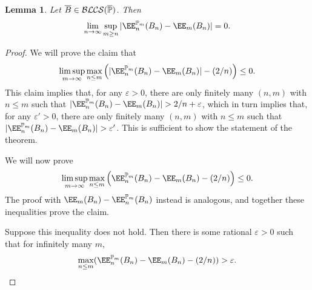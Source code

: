 \documentclass[authordate,onecolumn,noenvironments]{miri-tech-article}
\numberwithin{equation}{subsection}
\newtheorem{lemma}[theorem]{Lemma}
\newcommand{\seq}[1]{{\overline{#1}}}
\newcommand{\affluv}{B} %
\newcommand{\BLCS}[1][\MP]{\mathcal{B\-L\-C\-S}(#1)} %
\newcommand{\BelState}{\mathbb{P}}
\newcommand{\pt}{\BelState}
\newcommand{\MP}{\seq{\pt}}
\begin{document}
\begin{lemma}\label{lem:mesh}
  Let $\seq\affluv \in \BLCS$.  Then
  \[ \lim_{n \to \infty} \sup_{m \geq n} |\EE_n^{\pt_m}(\affluv_n) - \EE_m(\affluv_n)| = 0. \]
\end{lemma}
\begin{proof}
  
  
  We will  prove the claim that
%
\[ \limsup_{m \to \infty} \max_{n \leq m}\left(  |\EE_n^{\pt_m}(\affluv_n) - \EE_m(\affluv_n)| -(2/n) \right) \leq 0 .  \]
%
  This claim implies that, for any $\varepsilon > 0$, there are only finitely many $(n, m)$ with $n \leq m$ such that
  $|\EE_n^{\pt_m}(\affluv_n) - \EE_m(\affluv_n)| > 2/n + \varepsilon$, which in turn implies that, for any $\varepsilon' > 0$,
  there are only finitely many $(n, m)$ with $n \leq m$ such that $|\EE_n^{\pt_m}(\affluv_n) - \EE_m(\affluv_n)| > \varepsilon'$.
  This is sufficient to show the statement of the theorem.

  We will now prove
\[ \limsup_{m \to \infty} \max_{n \leq m}\left(  \EE_n^{\pt_m}(\affluv_n) - \EE_m(\affluv_n) -(2/n) \right) \leq 0 .  \]
The proof with $\EE_m(\affluv_n) - \EE_n^{\pt_m}(\affluv_n) $ instead is analogous, and together these inequalities prove the claim. 
  
  Suppose this inequality does not hold.
  Then there is some rational $\varepsilon > 0$ such that for infinitely many $m$,
  \[ \max_{n \leq m} (\EE_n^{\pt_m}(\affluv_n) - \EE_m(\affluv_n) - (2/n)) >  \varepsilon. \]



\end{proof}
\end{document}
